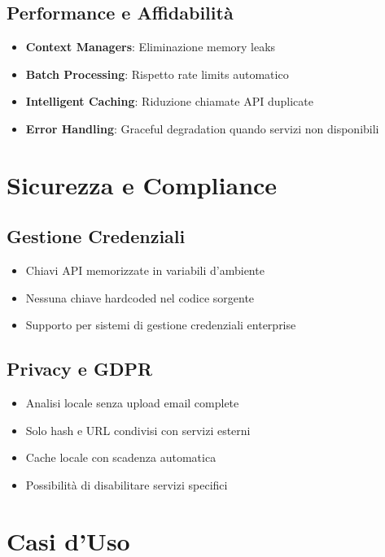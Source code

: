 \documentclass{article}
\begin{document}
\subsection{Performance e Affidabilità}

\begin{itemize}
    \item \textbf{Context Managers}: Eliminazione memory leaks
    \item \textbf{Batch Processing}: Rispetto rate limits automatico
    \item \textbf{Intelligent Caching}: Riduzione chiamate API duplicate
    \item \textbf{Error Handling}: Graceful degradation quando servizi non disponibili
\end{itemize}

\section{Sicurezza e Compliance}

\subsection{Gestione Credenziali}

\begin{itemize}
    \item Chiavi API memorizzate in variabili d'ambiente
    \item Nessuna chiave hardcoded nel codice sorgente
    \item Supporto per sistemi di gestione credenziali enterprise
\end{itemize}

\subsection{Privacy e GDPR}

\begin{itemize}
    \item Analisi locale senza upload email complete
    \item Solo hash e URL condivisi con servizi esterni
    \item Cache locale con scadenza automatica
    \item Possibilità di disabilitare servizi specifici
\end{itemize}

\section{Casi d'Uso}
\end{document}
